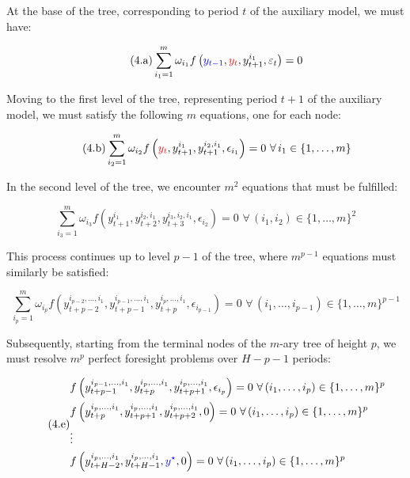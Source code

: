 \documentclass[a4paper,11pt]{amsart}
\begin{document}
At the base of the tree, corresponding to period \( t \) of the auxiliary model, we must have:

\begin{equation}\label{sep:perfect:0}\tag{4.a}
   \sum_{i_1=1}^m \omega_{i_1} f\left({\color{blue}y_{t-1}}, {\color{red}y_t}, y_{t+1}^{i_1}, \varepsilon_t \right) = 0
\end{equation}

Moving to the first level of the tree, representing period \( t+1 \)
of the auxiliary model, we must satisfy the following \( m \)
equations, one for each node:

\begin{equation}\label{sep:perfect:1}\tag{4.b}
   \sum_{i_2=1}^m \omega_{i_2} f\left({\color{red}y_{t}}, y_{t+1}^{i_1}, y_{t+1}^{i_2,i_1}, \epsilon_{i_1} \right) = 0\,\, \forall\, i_1\in \{1,\dots,m\}
\end{equation}

In the second level of the tree, we encounter \( m^2 \) equations that must be fulfilled:

\begin{equation}\label{sep:perfect:2}\tag{4.c}
   \sum_{i_3=1}^m \omega_{i_3} f\left(y_{t+1}^{i_1}, y_{t+2}^{i_2, i_1}, y_{t+3}^{i_3,i_2,i_1}, \epsilon_{i_2} \right) = 0\,\,  \forall\, (i_1,i_2)\in \{1,\dots,m\}^2
\end{equation}

This process continues up to level \(p-1\) of the tree,
where \(m^{p-1}\) equations must similarly be satisfied:

\begin{equation}\label{sep:perfect:p}\tag{4.d}
   \sum_{i_p=1}^m \omega_{i_p} f\left(y_{t+p-2}^{i_{p-2},\ldots,i_1}, y_{t+p-1}^{i_{p-1},\ldots,i_1}, y_{t+p}^{i_p,\ldots,i_1}, \epsilon_{i_{p-1}} \right) = 0\,\,  \forall\, (i_1,\ldots,i_{p-1})\in \{1,\dots,m\}^{p-1}
\end{equation}

Subsequently, starting from the terminal nodes of the \(m\)-ary tree
of height \( p \), we must resolve \(m^p\) perfect foresight problems
over \(H-p-1\) periods:

\begin{equation}\label{sep:perfect:leafs}\tag{4.e}
   \begin{split}
       & f\left(y_{t+p-1}^{i_{p-1},\ldots,i_1}, y_{t+p}^{i_{p},\ldots,i_1}, y_{t+p+1}^{i_p,\ldots,i_1}, \epsilon_{i_{p}} \right) = 0\,\,  \forall\, (i_1,\ldots,i_{p})\in \{1,\dots,m\}^{p} \\
       & f\left(y_{t+p}^{i_{p},\ldots,i_1}, y_{t+p+1}^{i_{p},\ldots,i_1}, y_{t+p+2}^{i_p,\ldots,i_1}, 0 \right) = 0\,\,  \forall\, (i_1,\ldots,i_{p})\in \{1,\dots,m\}^{p}                  \\
       & \vdots                                                                                                                                                                             \\
       & f\left(y_{t+H-2}^{i_{p},\ldots,i_1}, y_{t+H-1}^{i_{p},\ldots,i_1}, {\color{blue}y^{\star}}, 0 \right) = 0\,\,  \forall\, (i_1,\ldots,i_{p})\in \{1,\dots,m\}^{p}
   \end{split}
\end{equation}
\end{document}
